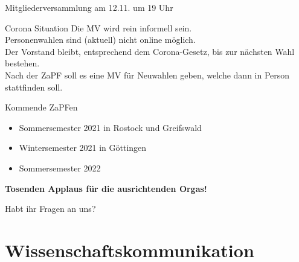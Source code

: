 \documentclass[compress, aspectratio=169]{beamer}
\begin{document}
\begin{frame}{Mitgliederversammlung am 12.11. um 19 Uhr}
  \begin{block}{Corona Situation}
    Die MV wird rein informell sein.\\
    Personenwahlen sind (aktuell) nicht online möglich.\\
    Der Vorstand bleibt, entsprechend dem Corona-Gesetz, bis zur nächsten Wahl bestehen.\\[1.5em]
    Nach der ZaPF soll es eine MV für Neuwahlen geben, welche dann in Person stattfinden soll.
  \end{block}
\end{frame}

\begin{frame}{Kommende ZaPFen}
  \begin{itemize}
    \item Sommersemester 2021 in Rostock und Greifswald
    \item Wintersemester 2021 in Göttingen
    \item Sommersemester 2022 \textit{\color{blue}{bei euch?}}    
\end{itemize}
    \vspace{1cm}
    \begin{center}
      \huge \textbf{Tosenden Applaus für die ausrichtenden Orgas!}
    \end{center}
\end{frame}

\begin{frame}[plain]
  \begin{center}
    \Huge Habt ihr Fragen an uns?
    \end{center}
\end{frame}


\section{Wissenschaftskommunikation}
\end{document}
